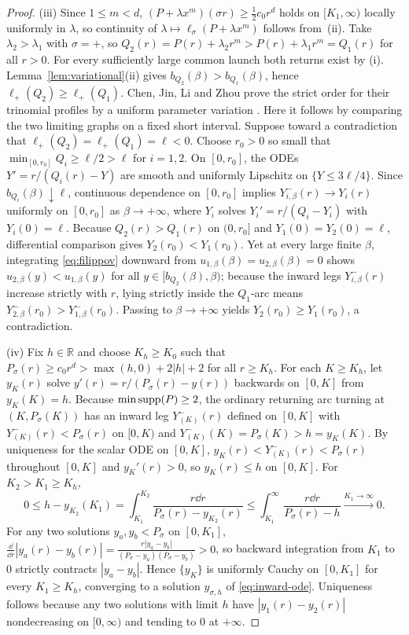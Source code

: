 \begin{proof}
(iii) Since $1\le m<d$, $(P+\lambda x^m)(\sigma r)\ge \frac{1}{2}c_0 r^d$ holds on $[K_1,\infty)$
locally uniformly in $\lambda$, so continuity of $\lambda\mapsto\ell_\sigma(P+\lambda x^m)$ follows
from~(ii). Take $\lambda_2>\lambda_1$ with $\sigma=+$, so $Q_2(r)=P(r)+\lambda_2 r^m > P(r)+\lambda_1
r^m = Q_1(r)$ for all $r>0$. For every sufficiently large common
launch both returns exist by (i). Lemma~\ref{lem:variational}(ii) gives $b_{Q_2}(\beta)>b_{Q_1}(\beta)$,
hence $\ell_+(Q_2)\ge \ell_+(Q_1)$. Chen, Jin, Li and Zhou prove the
strict order for their trinomial profiles by a uniform parameter
variation \cite[Lemma~2.9, (2.41)--(2.45)]{CJLZ}. Here it follows
by comparing the two limiting graphs on a fixed short interval. Suppose toward a contradiction that
$\ell_+(Q_2)=\ell_+(Q_1)=\ell<0$. Choose $r_0>0$ so small that $\min_{[0,r_0]} Q_i \ge \ell/2 > \ell$
for $i=1,2$. On $[0,r_0]$, the ODEs $Y'=r/(Q_i(r)-Y)$ are smooth and uniformly Lipschitz on $\{Y\le
3\ell/4\}$. Since $b_{Q_i}(\beta)\downarrow\ell$, continuous dependence on $[0,r_0]$ implies
$Y_{i,\beta}^-(r)\to Y_i(r)$ uniformly on $[0,r_0]$ as $\beta\to+\infty$, where $Y_i$ solves
$Y_i'=r/(Q_i-Y_i)$ with $Y_i(0)=\ell$. Because $Q_2(r)>Q_1(r)$ on $(0,r_0]$ and $Y_1(0)=Y_2(0)=\ell$,
differential comparison gives $Y_2(r_0)<Y_1(r_0)$. Yet at every large finite $\beta$, integrating
\eqref{eq:filippov} downward from $u_{1,\beta}(\beta)=u_{2,\beta}(\beta)=0$ shows
$u_{2,\beta}(y)<u_{1,\beta}(y)$ for all $y\in[b_{Q_2}(\beta),\beta)$; because the inward legs
$Y_{i,\beta}^-(r)$ increase strictly with $r$, lying strictly inside the $Q_1$-arc means
$Y_{2,\beta}^-(r_0)>Y_{1,\beta}^-(r_0)$. Passing to $\beta\to+\infty$ yields $Y_2(r_0)\ge Y_1(r_0)$, a
contradiction.

(iv) Fix $h\in\mathbb{R}$ and choose $K_h\ge K_0$ such that $P_\sigma(r)\ge c_0 r^d >
\max(h,0)+2|h|+2$ for all $r\ge K_h$. For each $K\ge K_h$, let $y_K(r)$ solve
$y'(r)=r/(P_\sigma(r)-y(r))$ backwards on $[0,K]$ from $y_K(K)=h$. Because $\min\operatorname{supp}(P)\ge 2$, the
ordinary returning arc turning at $(K,P_\sigma(K))$ has an inward leg $Y_{(K)}^-(r)$ defined on
$[0,K]$ with $Y_{(K)}^-(r)<P_\sigma(r)$ on $[0,K)$ and $Y_{(K)}^-(K)=P_\sigma(K)>h=y_K(K)$. By
uniqueness for the scalar ODE on $[0,K]$, $y_K(r)<Y_{(K)}^-(r)<P_\sigma(r)$ throughout $[0,K]$ and
$y_K'(r)>0$, so $y_K(r)\le h$ on $[0,K]$. For $K_2>K_1\ge K_h$,
\[
  0 \le h - y_{K_2}(K_1) = \int_{K_1}^{K_2} \frac{r\dd r}{P_\sigma(r)-y_{K_2}(r)} \le
  \int_{K_1}^\infty \frac{r\dd r}{P_\sigma(r)-h} \xrightarrow{K_1\to\infty} 0.
\]
For any two solutions $y_a,y_b<P_\sigma$ on $[0,K_1]$, $\frac{\dd}{\dd
r}|y_a(r)-y_b(r)|=\frac{r|y_a-y_b|}{(P_\sigma-y_a)(P_\sigma-y_b)}>0$, so backward integration from
$K_1$ to $0$ strictly contracts $|y_a-y_b|$. Hence $\{y_K\}$ is uniformly Cauchy on $[0,K_1]$ for
every $K_1\ge K_h$, converging to a solution $y_{\sigma,h}$ of \eqref{eq:inward-ode}. Uniqueness
follows because any two solutions with limit $h$ have $|y_1(r)-y_2(r)|$ nondecreasing on $[0,\infty)$
and tending to $0$ at $+\infty$.


\end{proof}
